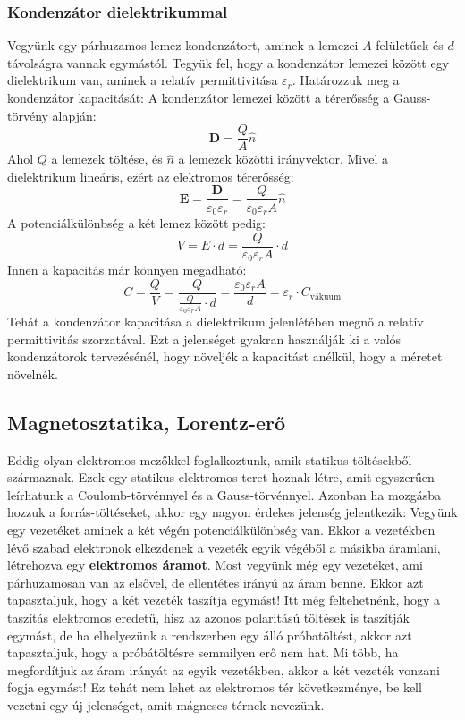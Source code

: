 \documentclass[../main.tex]{subfiles}
\begin{document}
\subsubsection{Kondenzátor dielektrikummal}
Vegyünk egy párhuzamos lemez kondenzátort, aminek a lemezei $A$ felületűek és $d$ távolságra vannak egymástól. Tegyük fel, hogy a kondenzátor lemezei között egy dielektrikum van, aminek a relatív permittivitása $\varepsilon_r$. Határozzuk meg a kondenzátor kapacitását:
A kondenzátor lemezei között a térerősség a Gauss-törvény alapján:
\begin{equation}
    \mathbf{D} = \frac{Q}{A} \hat{n}
\end{equation}
Ahol $Q$ a lemezek töltése, és $\hat{n}$ a lemezek közötti irányvektor. Mivel a dielektrikum lineáris, ezért az elektromos térerősség:
\begin{equation}
    \mathbf{E} = \frac{\mathbf{D}}{\varepsilon_0 \varepsilon_r} = \frac{Q}{\varepsilon_0 \varepsilon_r A} \hat{n}
\end{equation}
A potenciálkülönbség a két lemez között pedig:
\begin{equation}
    V = E \cdot d = \frac{Q}{\varepsilon_0 \varepsilon_r A} \cdot d
\end{equation}
Innen a kapacitás már könnyen megadható:
\begin{equation}
    C = \frac{Q}{V} = \frac{Q}{\frac{Q}{\varepsilon_0 \varepsilon_r A} \cdot d} = \frac{\varepsilon_0 \varepsilon_r A}{d} = \varepsilon_r \cdot C_{\text{vákuum}}
\end{equation}
Tehát a kondenzátor kapacitása a dielektrikum jelenlétében megnő a relatív permittivitás szorzatával. Ezt a jelenséget gyakran használják ki a valós kondenzátorok tervezésénél, hogy növeljék a kapacitást anélkül, hogy a méretet növelnék.

\subsection{Magnetosztatika, Lorentz-erő}
Eddig olyan elektromos mezőkkel foglalkoztunk, amik statikus töltésekből származnak. Ezek egy statikus elektromos teret hoznak létre, amit egyszerűen leírhatunk a Coulomb-törvénnyel és a Gauss-törvénnyel.
Azonban ha mozgásba hozzuk a forrás-töltéseket, akkor egy nagyon érdekes jelenség jelentkezik: Vegyünk egy vezetéket aminek a két végén potenciálkülönbség van.
Ekkor a vezetékben lévő szabad elektronok elkezdenek a vezeték egyik végéből a másikba áramlani, létrehozva egy \textbf{elektromos áramot}. Most vegyünk még egy vezetéket, ami párhuzamosan van az elsővel,
de ellentétes irányú az áram benne. Ekkor azt tapasztaljuk, hogy a két vezeték taszítja egymást! Itt még feltehetnénk, hogy a taszítás elektromos eredetű, hisz az azonos polaritású töltések is taszítják egymást, de
ha elhelyezünk a rendszerben egy álló próbatöltést, akkor azt tapasztaljuk, hogy a próbátöltésre semmilyen erő nem hat. Mi több, ha megfordítjuk az áram irányát az egyik vezetékben, akkor a két vezeték vonzani fogja egymást!
Ez tehát nem lehet az elektromos tér következménye, be kell vezetni egy új jelenséget, amit mágneses térnek nevezünk.
\end{document}

